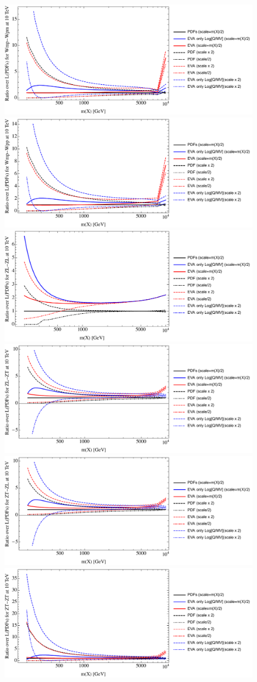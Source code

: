 \documentclass[a4paper,11pt]{article}
\begin{document}
\begin{figure}[ht]
\includegraphics[width=0.46\linewidth]{PlotLumi/10TeV/ratios/Wmp-Wpm.pdf}
\includegraphics[width=0.46\linewidth]{PlotLumi/10TeV/ratios/Wmp-Wpp.pdf}
\includegraphics[width=0.46\linewidth]{PlotLumi/10TeV/ratios/ZL-ZL.pdf}
\includegraphics[width=0.46\linewidth]{PlotLumi/10TeV/ratios/ZL-ZT.pdf}
\includegraphics[width=0.46\linewidth]{PlotLumi/10TeV/ratios/ZT-ZL.pdf}
\includegraphics[width=0.46\linewidth]{PlotLumi/10TeV/ratios/ZT-ZT.pdf}
\end{figure}
\end{document}
